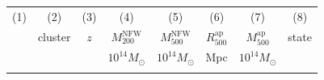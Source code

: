 \documentclass[useAMS,usenatbib]{mnras}
\begin{document}
\begin{table}
\begin{tabularx}{1.0\textwidth}{ l l r r r r r r}
\multicolumn{1}{c}{(1) } & \multicolumn{1}{c}{ (2) } & \multicolumn{1}{c}{ (3) } & \multicolumn{1}{c}{ (4) } & \multicolumn{1}{c}{ (5) } & \multicolumn{1}{c}{ (6) } & \multicolumn{1}{c}{ (7) } & \multicolumn{1}{c}{ (8) } \\
    & \multicolumn{1}{c}{cluster}  & \multicolumn{1}{c}{$z$} &  \multicolumn{1}{c}{ $M^\mathrm{NFW}_{200}$  } & \multicolumn{1}{c}{$M^\mathrm{NFW}_{500}$} & \multicolumn{1}{c}{ $R^\mathrm{ap}_{500}$} & \multicolumn{1}{c}{$M^\mathrm{ap}_{500}$} & state \\
    
  & & & \multicolumn{1}{c}{$10^{14} M_\odot$ } &  \multicolumn{1}{c}{$10^{14} M_\odot$ } &  \multicolumn{1}{c}{ Mpc } & \multicolumn{1}{c}{$10^{14} M_\odot$ } &  \\
 
 \hline
 \\
 

\end{tabularx}
\end{table}
\end{document}
